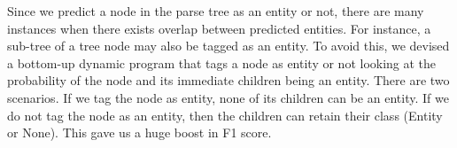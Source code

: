 \begin{enumerate}
 Since we predict a node in the parse tree as an entity or not, there are many instances when there exists overlap between predicted entities. For instance, a sub-tree of a tree node may also be tagged as an entity. To avoid this, we devised a bottom-up dynamic program that tags a node as entity or not looking at the probability of the node and its immediate children being an entity. There are two scenarios. If we tag the node as entity, none of its children can be an entity. If we do not tag the node as an entity, then the children can retain their class (Entity or None). This gave us a huge boost in F1 score.

\end{enumerate}